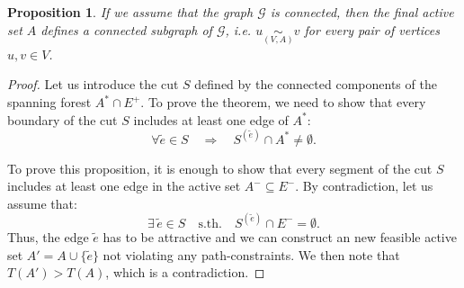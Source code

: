 \documentclass[12pt]{article}
\newcommand\TODO[1]{\fbox{\textcolor{red}{TODO: #1}}}
\newtheorem{prop}{Proposition}[section]
\begin{document}
\begin{prop} \label{prop:A_connected}
If we assume that the graph $\mathcal{G}$ is connected, then the final active set $A$ defines a connected subgraph of $\mathcal{G}$, i.e. $u \underset{(V,A)}{\sim}v$ for every pair of vertices $u,v \in V$. 
\end{prop}
\begin{proof}
Let us introduce the cut $S$ defined by the connected components of the spanning forest  $A^{*} \cap E^+$. To prove the theorem, we need to show that every boundary of the cut $S$ includes at least one edge of $A^*$:
\begin{equation}
\forall \tilde{e} \in S \quad \Longrightarrow \quad S^{(\tilde{e})}\cap A^* \neq \emptyset.
\end{equation}

To prove this proposition, it is enough to show that every segment of the cut $S$ includes at least one edge in the active set $A^- \subseteq E^-$. 
By contradiction, let us assume that:
\begin{equation}
\exists \, \tilde{e} \in S \quad \mathrm{s.th.} \quad S^{(\tilde{e})}\cap E^- = \emptyset.
\end{equation}
Thus, the edge $\tilde{e}$ has to be attractive and we can construct an new feasible active set $A'= A \cup \{\tilde{e}\}$ not violating any path-constraints. \TODO{Explain better} We then note that $T(A')>T(A)$, which is a contradiction. 

\end{proof}
\end{document}
